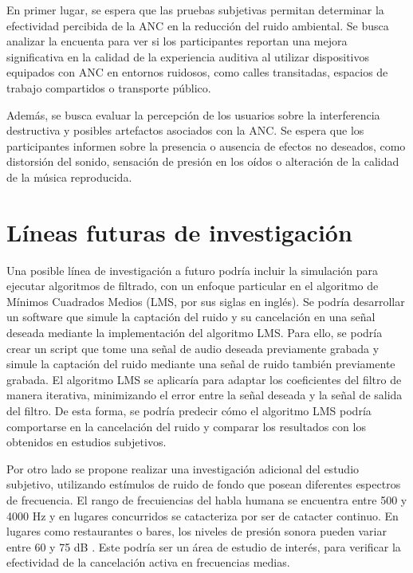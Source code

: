 \documentclass[a4paper,12pt]{article}
\begin{document}
En primer lugar, se espera que las pruebas subjetivas permitan determinar la efectividad percibida de la ANC en la reducción del ruido ambiental.
Se busca analizar la encuenta para ver si los participantes reportan una mejora significativa en la calidad de la experiencia auditiva al utilizar dispositivos equipados con ANC en entornos ruidosos, como calles transitadas, espacios de trabajo compartidos o transporte público.

Además, se busca evaluar la percepción de los usuarios sobre la interferencia destructiva y posibles artefactos asociados con la ANC.
Se espera que los participantes informen sobre la presencia o ausencia de efectos no deseados, como distorsión del sonido, sensación de presión en los oídos o alteración de la calidad de la música reproducida.

\section{Líneas futuras de investigación}

Una posible línea de investigación a futuro podría incluir la simulación para ejecutar algoritmos de filtrado, con un enfoque particular en el algoritmo de Mínimos Cuadrados Medios (LMS, por sus siglas en inglés).
Se podría desarrollar un software que simule la captación del ruido y su cancelación en una señal deseada mediante la implementación del algoritmo LMS.
Para ello, se podría crear un script que tome una señal de audio deseada previamente grabada y simule la captación del ruido mediante una señal de ruido también previamente grabada.
El algoritmo LMS se aplicaría para adaptar los coeficientes del filtro de manera iterativa, minimizando el error entre la señal deseada y la señal de salida del filtro.
De esta forma, se podría predecir cómo el algoritmo LMS podría comportarse en la cancelación del ruido y comparar los resultados con los obtenidos en estudios subjetivos.

Por otro lado se propone realizar una investigación adicional del estudio subjetivo, utilizando estímulos de ruido de fondo que posean diferentes espectros de frecuencia.
El rango de frecuiencias del habla humana se encuentra entre 500 y 4000 $\si{\hertz}$ y en lugares concurridos se catacteriza por ser de catacter continuo.
En lugares como restaurantes o bares, los niveles de presión sonora pueden variar entre 60 y 75 \si{\deci \bel} \parencite{Scott2024}.
Este podría ser un área de estudio de interés, para verificar la efectividad de la cancelación activa en frecuencias medias.
\end{document}
